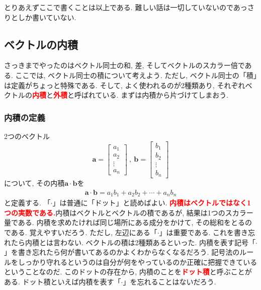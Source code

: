とりあえずここで書くことは以上である. 難しい話は一切していないのであっさりとしか書いていない. 
\subsection{ベクトルの内積}
さっきまでやったのはベクトル同士の和, 差, そしてベクトルのスカラー倍である. 
ここでは, ベクトル同士の積について考えよう. 
ただし, ベクトル同士の「積」は定義がちょっと特殊である. 
そして, よく使われるのが2種類あり, それぞれベクトルの\textbf{\textcolor{red}{内積}}と\textbf{\textcolor{red}{外積}}と呼ばれている. 
まずは内積から片づけてしまおう. 
\subsubsection{内積の定義}
2つのベクトル
$$
\bm{a} = \left[
 \begin{array}{c}
   a_1 \\
   a_2 \\
   \vdots \\
   a_n 
 \end{array}
            \right]
\ , \ 
\bm{b} = \left[
 \begin{array}{c}
   b_1 \\
   b_2 \\
   \vdots \\
   b_n 
 \end{array}
            \right]
$$について, その内積$\bm{a} \cdot \bm{b}$を
\begin{eqnarray}
\bm{a} \cdot \bm{b} = a_1 b_1 + a_2 b_2 + \cdots + a_n b_n
\label{eq:naiseki}
\end{eqnarray}
と定義する. 「$\cdot$」は普通に「ドット」と読めばよい. 
\textbf{\textcolor{red}{内積はベクトルではなく1つの実数である.}}内積はベクトルとベクトルの積であるが, 結果は1つのスカラー量である. 
内積を求めたければ同じ場所にある成分をかけて, その総和をとるのである. 
覚えやすいだろう. ただし, 左辺にある「$\cdot$」は重要である. これを書き忘れたら内積とは言わない. 
ベクトルの積は2種類あるといった. 内積を表す記号「$\cdot$」を書き忘れたら何が書いてあるのかよくわからなくなるだろう. 
記号法のルールをしっかり守れるというのは自分が何をやっているのか正確に把握できているということなのだ. 
このドットの存在から, 内積のことを\textbf{\textcolor{red}{ドット積}}と呼ぶことがある. 
ドット積といえば内積を表す「$\cdot$」を忘れることはないだろう. 

